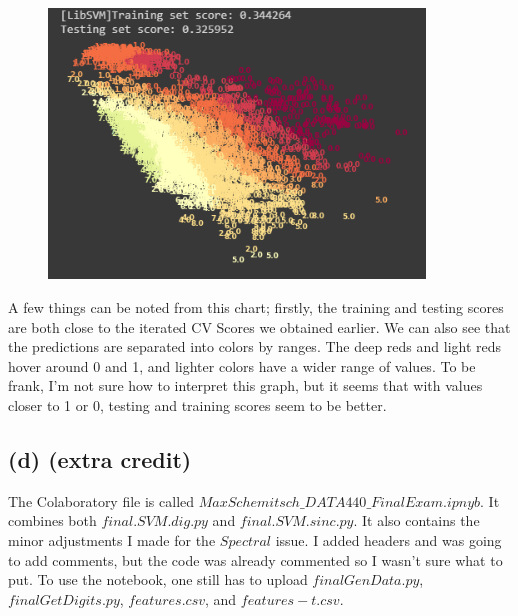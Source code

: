 \documentclass[a4paper]{article}
\begin{document}
\begin{figure}[h]
  \begin{center}
    \includegraphics[width=100mm,scale=1]{problem2b2.png}
  \end{center}
\end{figure}


A few things can be noted from this chart; firstly, the training and testing scores are both close to the iterated CV Scores we obtained earlier. We can also see that the predictions are separated into colors by ranges. The deep reds and light reds hover around 0 and 1, and lighter colors have a wider range of values. To be frank, I'm not sure how to interpret this graph, but it seems that with values closer to 1 or 0, testing and training scores seem to be better.


\newpage


\subsection{(d) (extra credit)}
The Colaboratory file is called $MaxSchemitsch\_DATA440\_FinalExam.ipnyb$. It combines both $final.SVM.dig.py$ and $final.SVM.sinc.py$. It also contains the minor adjustments I made for the $Spectral$ issue. I added headers and was going to add comments, but the code was already commented so I wasn't sure what to put. To use the notebook, one still has to upload $finalGenData.py$, $finalGetDigits.py$, $features.csv$, and $features-t.csv$.
\end{document}
